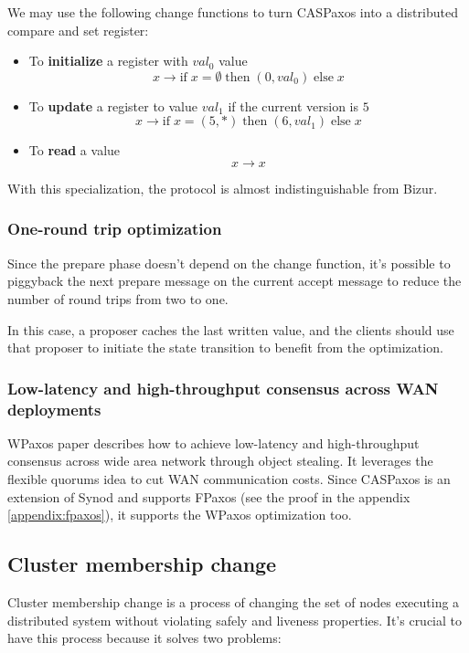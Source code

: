 \documentclass[12pt]{article}
\theoremstyle{definition}
\begin{document}
We may use the following change functions to turn CASPaxos into a distributed compare and set register:
\begin{itemize}
  \item To {\bf initialize} a register with $val_0$ value
  $$x \to \mbox{if}\; x = \emptyset \;\mbox{then}\; (0, val_0)\; \mbox{else}\; x$$
  
  \item To {\bf update} a register to value $val_1$ if the current version is $5$
  $$x \to \mbox{if}\; x = (5, \ast) \;\mbox{then}\; (6, val_1)\; \mbox{else}\; x$$
  
  \item To {\bf read} a value
  $$x \to x$$
\end{itemize}

With this specialization, the protocol is almost indistinguishable from Bizur\cite{bizur}.

\subsubsection{One-round trip optimization}\label{1rtt}

Since the prepare phase doesn't depend on the change function, it's possible to piggyback the next prepare message on the current accept message to reduce the number of round trips from two to one.

In this case, a proposer caches the last written value, and the clients should use that proposer to initiate the state transition to benefit from the optimization.

\subsubsection{Low-latency and high-throughput consensus across WAN deployments}

WPaxos\cite{wpaxos} paper describes how to achieve low-latency and high-throughput consensus across wide area network through object stealing. It leverages the flexible quorums\cite{fpaxos} idea to cut WAN communication costs. Since CASPaxos is an extension of Synod and supports FPaxos (see the proof in the appendix \ref{appendix:fpaxos}), it supports the WPaxos optimization too.

\subsection{Cluster membership change}

Cluster membership change is a process of changing the set of nodes executing a distributed system without violating safely and liveness properties. It's crucial to have this process because it solves two problems:
\end{document}
